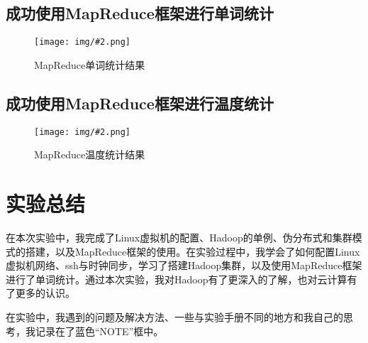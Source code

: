 \documentclass{article}
\newcommand{\img}[3][0.9]{%
    \begin{figure}[H]
        \centering
        \texttt{[image: img/\#2.png]}
        \caption{#3}
    \end{figure}
}
\begin{document}
\subsection{成功使用MapReduce框架进行单词统计}
\img{8.2.1}{MapReduce单词统计结果}

\subsection{成功使用MapReduce框架进行温度统计}
\img{8.3.1}{MapReduce温度统计结果}

\section{实验总结}

在本次实验中，我完成了Linux虚拟机的配置、Hadoop的单例、伪分布式和集群模式的搭建，以及MapReduce框架的使用。在实验过程中，我学会了如何配置Linux虚拟机网络、ssh与时钟同步，学习了搭建Hadoop集群，以及使用MapReduce框架进行了单词统计。通过本次实验，我对Hadoop有了更深入的了解，也对云计算有了更多的认识。

在实验中，我遇到的问题及解决方法、一些与实验手册不同的地方和我自己的思考，我记录在了蓝色“NOTE”框中。
\end{document}
